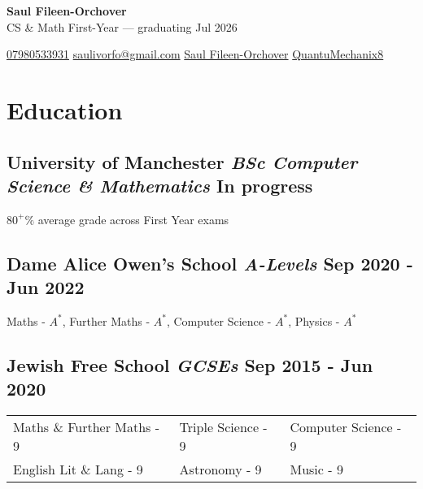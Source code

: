 \documentclass[a4paper,10pt]{article}
\begin{document}
\pagestyle{empty}


\begin{center}
    \textbf{\Huge Saul Fileen-Orchover} \\
    \vspace{1mm}
     CS \& Math First-Year --- graduating Jul 2026
\end{center}

\begin{center}
    \hspace{1ex}
     \href{https://wa.me/1234567890}{07980533931} \hfill
     \href{mailto:saulivorfo@gmail.com}{saulivorfo@gmail.com} \hfill
     \href{https://www.linkedin.com/in/saul-fileen-orchover-4305872a0}{Saul Fileen-Orchover} \hfill
     \href{https://github.com/QuantuMechanix8}{QuantuMechanix8} 
    \hspace{1ex} \hfill
\end{center}

\vspace{-3mm}

\section*{ Education}

\subsection*{University of Manchester \hfill 
{\color{black}\textit{\textmd{BSc Computer Science \& Mathematics}}}\hspace{1ex} In progress}
$80^+\%$ average grade across First Year exams

\subsection*{Dame Alice Owen's School \hfill
{\color{black}\textit{\textmd{A-Levels}}}\hspace{1ex} Sep 2020 - Jun 2022}

Maths - $A^*$, 
Further Maths - $A^*$, 
Computer Science - $A^*$, 
Physics - $A^*$

\subsection*{Jewish Free School \hfill 
{\color{black}\textit{\textmd{GCSEs}}}\hspace{1ex} Sep 2015 - Jun 2020}
\begin{tabular}{@{} l l l}
    Maths \& Further Maths - 9 & Triple Science - 9 & Computer Science - 9\\
    English Lit \& Lang - 9 & Astronomy - 9 & Music - 9
\end{tabular}
\end{document}
